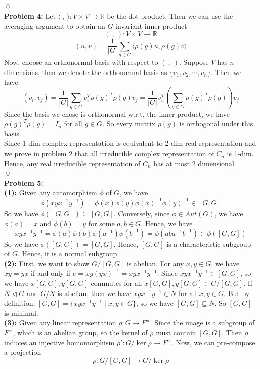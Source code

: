 \documentclass[12pt]{amsart}
\newcommand{\R}{\mathbb{R}}
\newcommand{\normal}{\triangleleft}
\begin{document}
\\\qed\\
\textbf{Problem 4:} Let $\langle\ ,\ \rangle: V\times V\to \R$ be the dot product. Then we can use the averaging argument to obtain an $G$-invariant inner product
\[(\ ,\ ):V\times V\to \R\]
\[(u,v)=\frac{1}{|G|}\sum_{g\in G}\langle \rho(g)u,\rho(g)v\rangle\]
Now, choose an orthonormal basis with respect to $(\ ,\ )$. Suppose $V$ has $n$ dimensions, then we denote the orthonormal basis as $\{v_1,v_2,\cdots, v_n\}$. Then we have 
\[(v_i,v_j)=\frac{1}{|G|}\sum_{g\in G} v_i^T\rho(g)^T\rho(g)v_j=\frac{1}{|G|} v_i^T(\sum_{g\in G}\rho(g)^T\rho(g))v_j\]
Since the basis we chose is orthonormal w.r.t. the inner product, we have $\rho(g)^T\rho(g)=I_n$ for all $g\in G$. So every matrix $\rho(g)$ is orthogonal under this basis.\\
Since 1-dim complex representation is equivalent to 2-dim real representation and we prove in problem 2 that all irreducible complex representation of $C_n$ is 1-dim. Hence, any real irreducible representation of $C_n$ has at most 2 dimensional.
\\\qed\\
\textbf{Problem 5:}
\textbf{\\(1):} Given any automorphism $\phi$ of $G$, we have 
\[\phi(xyx^{-1}y^{-1})=\phi(x)\phi(y)\phi(x)^{-1}\phi(y)^{-1}\in [G,G]\]
So we have $\phi([G,G])\subseteq [G,G]$. Conversely, since $\phi\in Aut(G)$, we have $\phi(a)=x$ and $\phi(b)=y$ for some $a,b\in G$. Hence, we have 
\[xyx^{-1}y^{-1}=\phi(a)\phi(b)\phi(a^{-1})\phi(b^{-1})=\phi(aba^{-1}b^{-1})\in\phi([G,G])\]
So we have $\phi([G,G])=[G,G]$. Hence, $[G,G]$ is a characteristic subgroup of $G$. Hence, it is a normal subgroup.
\\\textbf{(2):} First, we want to show $G/[G,G]$ is abelian. For any $x,y\in G$, we have $xy=yx$ if and only if $e=xy(yx)^{-1}=xyx^{-1}y^{-1}$. Since $xyx^{-1}y^{-1}\in [G,G]$, so we have $x[G,G],y[G,G]$ commutes for all $x[G,G],y[G,G]\in G/[G,G]$. If $N\normal G$ and $G/N$ is abelian, then we have $xyx^{-1}y^{-1}\in N$ for all $x,y\in G$. But by definition, $[G,G]=\{xyx^{-1}y^{-1}\mid x,y\in G\}$, so we have $[G,G]\subseteq N$. So $[G,G]$ is minimal.\\
\textbf{(3): }Given any linear representation $\rho: G\to F^\times$. Since the image is a subgroup of $F^\times$, which is an abelian group, so the kernel of $\rho$ must contain $[G,G]$. Then $\rho$ induces an injective homomorphism $\rho':G/\ker\rho\to F^\times$. Now, we can pre-compose a projection 
\[p:G/[G,G]\to G/\ker\rho\]
\end{document}

